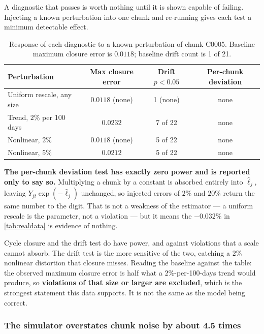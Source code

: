 \documentclass[12pt,a4paper,oneside]{article}
\begin{document}
\begin{remark}\label{rem:power}
A diagnostic that passes is worth nothing until it is shown capable of failing.
Injecting a known perturbation into one chunk and re-running gives each test a
minimum detectable effect.

\begin{table}[H]
\centering
\small
\caption{Response of each diagnostic to a known perturbation of chunk C0005.
Baseline maximum closure error is $0.0118$; baseline drift count is 1 of 21.}
\label{tab:power}
\begin{tabular}{lccc}
\toprule
Perturbation & Max closure error & Drift $p<0.05$ & Per-chunk deviation\\
\midrule
Uniform rescale, any size & $0.0118$ (none) & 1 (none) & none\\
Trend, $2\%$ per 100 days & $0.0232$ & 7 of 22 & none\\
Nonlinear, $2\%$ & $0.0118$ (none) & 5 of 22 & none\\
Nonlinear, $5\%$ & $0.0212$ & 5 of 22 & none\\
\bottomrule
\end{tabular}
\end{table}

\textbf{The per-chunk deviation test has exactly zero power and is reported only
to say so.} Multiplying a chunk by a constant is absorbed entirely into
$\hat\ell_j$, leaving $Y_{jt}\exp(-\hat\ell_j)$ unchanged, so injected errors of
$2\%$ and $20\%$ return the same number to the digit. That is not a weakness of
the estimator --- a uniform rescale is the parameter, not a violation --- but it
means the $-0.032\%$ in \cref{tab:realdata} is evidence of nothing.

Cycle closure and the drift test do have power, and against violations that a
scale cannot absorb. The drift test is the more sensitive of the two, catching a
$2\%$ nonlinear distortion that closure misses. Reading the baseline against the
table: the observed maximum closure error is half what a $2\%$-per-100-days trend
would produce, so \textbf{violations of that size or larger are excluded}, which
is the strongest statement this data supports. It is not the same as the model
being correct.
\end{remark}

\subsubsection{The simulator overstates chunk noise by about 4.5 times}
\end{document}

